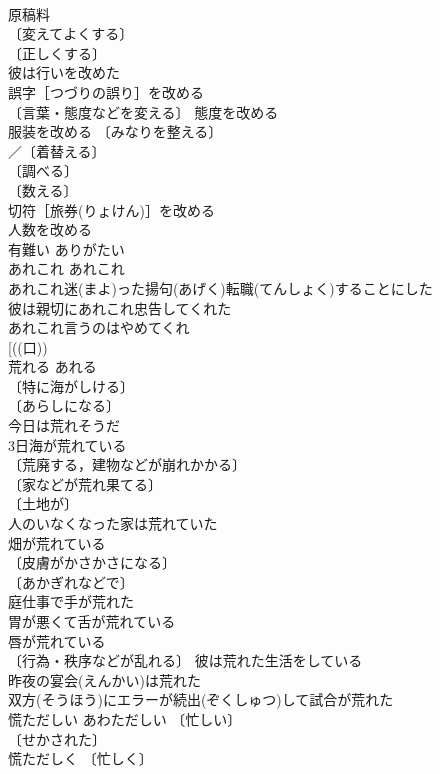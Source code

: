 \documentclass[8pt]{extreport}
\begin{document}
\begin{CJK}{UTF8}{min}
\\	原稿料 
\\	〔変えてよくする〕
\\	〔正しくする〕
\\	彼は行いを改めた 
\\	誤字［つづりの誤り］を改める 
\\	〔言葉・態度などを変える〕 態度を改める 
\\	服装を改める 〔みなりを整える〕
\\	／〔着替える〕
\\	〔調べる〕
\\	〔数える〕
\\	切符［旅券(りょけん)］を改める 
\\	人数を改める 
\\	有難い	ありがたい	
\\	あれこれ	あれこれ	
\\	あれこれ迷(まよ)った揚句(あげく)転職(てんしょく)することにした 
\\	彼は親切にあれこれ忠告してくれた 
\\	あれこれ言うのはやめてくれ 
\\	[((口)) 
\\	荒れる	あれる	
\\	〔特に海がしける〕
\\	〔あらしになる〕
\\	今日は荒れそうだ 
\\	3日海が荒れている 
\\	〔荒廃する，建物などが崩れかかる〕
\\	〔家などが荒れ果てる〕
\\	〔土地が〕
\\	人のいなくなった家は荒れていた 
\\	畑が荒れている 
\\	〔皮膚がかさかさになる〕
\\	〔あかぎれなどで〕
\\	庭仕事で手が荒れた 
\\	胃が悪くて舌が荒れている 
\\	唇が荒れている 
\\	〔行為・秩序などが乱れる〕 彼は荒れた生活をしている 
\\	昨夜の宴会(えんかい)は荒れた 
\\	双方(そうほう)にエラーが続出(ぞくしゅつ)して試合が荒れた 
\\	慌ただしい	あわただしい	〔忙しい〕
\\	〔せかされた〕
\\	慌ただしく 〔忙しく〕

\end{CJK}
\end{document}

